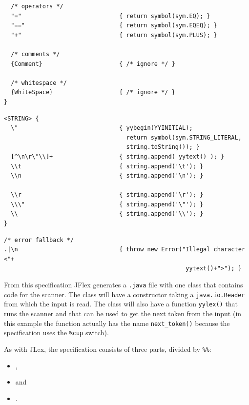 \documentclass[11pt]{scrartcl}
\begin{document}
{\begin{verbatim}
  /* operators */
  "="                            { return symbol(sym.EQ); }
  "=="                           { return symbol(sym.EQEQ); }
  "+"                            { return symbol(sym.PLUS); }

  /* comments */
  {Comment}                      { /* ignore */ }
 
  /* whitespace */
  {WhiteSpace}                   { /* ignore */ }
}
\end{verbatim}
\label{CodeRulesYYtext}\begin{verbatim}
<STRING> {
  \"                             { yybegin(YYINITIAL); 
                                   return symbol(sym.STRING_LITERAL, 
                                   string.toString()); }
  [^\n\r\"\\]+                   { string.append( yytext() ); }
  \\t                            { string.append('\t'); }
  \\n                            { string.append('\n'); }

  \\r                            { string.append('\r'); }
  \\\"                           { string.append('\"'); }
  \\                             { string.append('\\'); }
}
\end{verbatim}
\label{CodeRulesAllStates}\begin{verbatim}
/* error fallback */
.|\n                             { throw new Error("Illegal character <"+
                                                    yytext()+">"); }
\end{verbatim}
}

From this specification JFlex generates a \texttt{.java} file with one
class that contains code for the scanner. The class will have a
constructor taking a \texttt{java.io.Reader} from which the input is
read. The class will also have a function \texttt{yylex()} that runs the
scanner and that can be used to get the next token from the input (in this
example the function actually has the name \texttt{next\_token()} because
the specification uses the \texttt{\%cup} switch).

As with JLex, the specification consists of three parts, divided by \texttt{\%\%}:
\begin{itemize}
\item {},
\item {} and 
\item {}.
\end{itemize}
\end{document}
